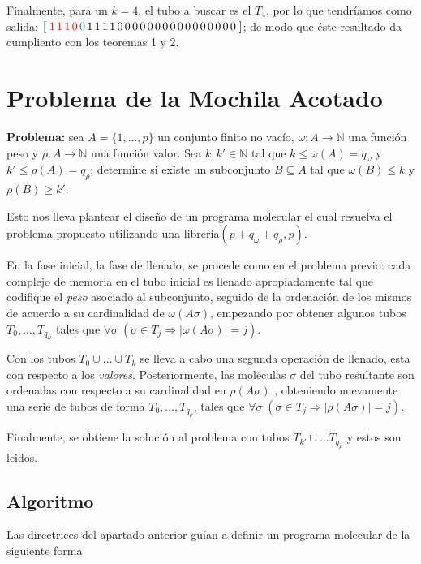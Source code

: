 \documentclass[12pt, letterpaper, twoside]{article}
\begin{document}
    Finalmente, para un $k=4$, el tubo a buscar es el $T_4$, por lo que tendríamos como salida: $[\;\textcolor{red}{1\,1\,1\,0}\textcolor{teal}{\,0}\,1\,1\,1\,1\,0\,0\,0\,0\,0\,0\,0\,0\,0\,0\,0\,0\,0\,0\,0\,0\;]$; de modo que éste resultado da cumpliento  con los teoremas 1 y 2.


    \newpage
    \section{Problema de la Mochila Acotado}
    \textbf{Problema:} sea $A=\{1,\dots,p\}$ un conjunto finito no vacío, $\omega:A\rightarrow\mathbb{N}$ una función peso y $\rho:A\rightarrow\mathbb{N}$ una función valor. Sea $k, k'\in\mathbb{N}$ tal que $k\leq\omega(A)=q_\omega$ y $k'\leq\rho(A)=q_\rho$; determine si existe un subconjunto $B\subseteq A$ tal que $\omega(B)\leq k$ y $\rho(B)\geq k'$.


    Esto nos lleva plantear el diseño de un programa molecular el cual resuelva el problema propuesto utilizando una librería$(p+q_\omega+q_\rho, p)$.


    En la fase inicial, la fase de llenado, se procede como en el problema previo: cada complejo de memoria en el tubo inicial es llenado apropiadamente tal que codifique el \emph{peso} asociado al subconjunto, seguido de la ordenación de los mismos de acuerdo a su cardinalidad de $\omega(A\sigma)$, empezando por obtener algunos tubos $T_0,\dots,T_{q_\omega}$ tales que $\forall\sigma\;(\sigma\in T_j \Rightarrow |\omega(A\sigma)|=j)$.


    Con los tubos $T_0\cup\dots\cup T_k$ se lleva a cabo una segunda operación de llenado, esta con respecto a los \emph{valores}. Posteriormente, las moléculas $\sigma$ del tubo resultante son ordenadas con respecto a su cardinalidad en $\rho(A\sigma)$ , obteniendo nuevamente una serie de tubos de forma $T_0,\dots,T_{q_\rho}$, tales que $\forall\sigma\;(\sigma\in T_j \Rightarrow |\rho(A\sigma)| = j)$.


    Finalmente, se obtiene la solución al problema con tubos $T_{k'}\cup\dots T_{q_\rho}$ y estos son leidos.
    \newpage
    \subsection{Algoritmo}
    Las directrices del apartado anterior guían a definir un programa molecular de la siguiente forma
\end{document}

